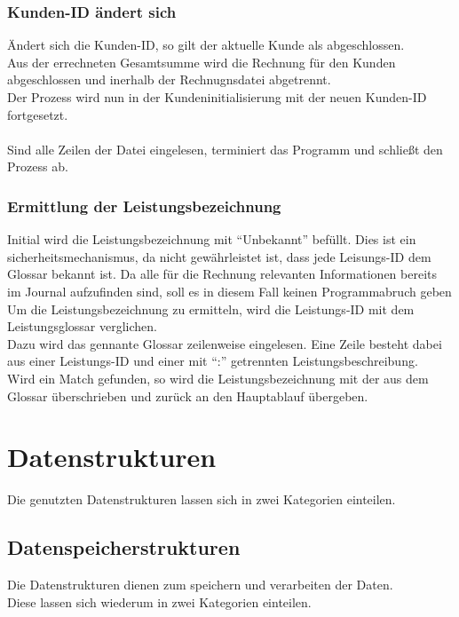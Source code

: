 \subsubsection{Kunden-ID ändert sich}\label{subsubsec:kunden-id-aendert-sich}
Ändert sich die Kunden-ID, so gilt der aktuelle Kunde als abgeschlossen.\\
Aus der errechneten Gesamtsumme wird die Rechnung für den Kunden abgeschlossen und inerhalb der Rechnugnsdatei abgetrennt.\\
Der Prozess wird nun in der Kundeninitialisierung mit der neuen Kunden-ID fortgesetzt.\\
\\

Sind alle Zeilen der Datei eingelesen, terminiert das Programm und schließt den Prozess ab.\\

\subsubsection{Ermittlung der Leistungsbezeichnung}\label{subsubsec:ermittlung-der-leistungsbezeichnung}
Initial wird die Leistungsbezeichnung mit \enquote{Unbekannt} befüllt. Dies ist ein sicherheitsmechanismus, da nicht gewährleistet ist, dass jede Leisungs-ID dem Glossar bekannt ist. Da alle für die Rechnung relevanten Informationen bereits im Journal aufzufinden sind, soll es in diesem Fall keinen Programmabruch geben\\
Um die Leistungsbezeichnung zu ermitteln, wird die Leistungs-ID mit dem Leistungsglossar verglichen.\\
Dazu wird das gennante Glossar zeilenweise eingelesen. Eine Zeile besteht dabei aus einer Leistungs-ID und einer mit \enquote{:} getrennten Leistungsbeschreibung.\\
Wird ein Match gefunden, so wird die Leistungsbezeichnung mit der aus dem Glossar überschrieben und zurück an den Hauptablauf übergeben.\\

\section{Datenstrukturen}\label{subsec:datenstrukt}
Die genutzten Datenstrukturen lassen sich in zwei Kategorien einteilen.\\

\subsection{Datenspeicherstrukturen}\label{subsubsec:dynamische-datenstrukturen}
Die Datenstrukturen dienen zum speichern und verarbeiten der Daten.\\
Diese lassen sich wiederum in zwei Kategorien einteilen.\\


